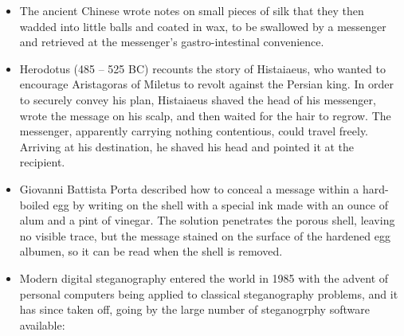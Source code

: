 \begin{itemize}
    \item{} The ancient Chinese wrote notes on small pieces of silk that they
        then wadded into little balls and coated in wax, to be swallowed by a
        messenger and retrieved at the messenger's gastro-intestinal
        convenience.
    \item{} Herodotus (485 -- 525 BC) recounts the story of Histaiaeus, who
        wanted to encourage Aristagoras of Miletus to revolt against the
        Persian king. In order to securely convey his plan, Histaiaeus shaved
        the head of his messenger, wrote the message on his scalp, and then
        waited for the hair to regrow. The messenger, apparently carrying
        nothing contentious, could travel freely. Arriving at his destination,
        he shaved his head and pointed it at the recipient.
    \item{} Giovanni Battista Porta described how to conceal a message within
        a hard-boiled egg by writing on the shell with a special ink made with
        an ounce of alum and a pint of vinegar. The solution penetrates the
        porous shell, leaving no visible trace, but the message stained on the
        surface of the hardened egg albumen, so it can be read when the shell
        is removed.
    \item{} Modern digital steganography entered the world in 1985 with the
        advent of personal computers being applied to classical steganography
        problems, and it has since taken off, going by the large number of
        steganogrphy software available:
        
\end{itemize}
